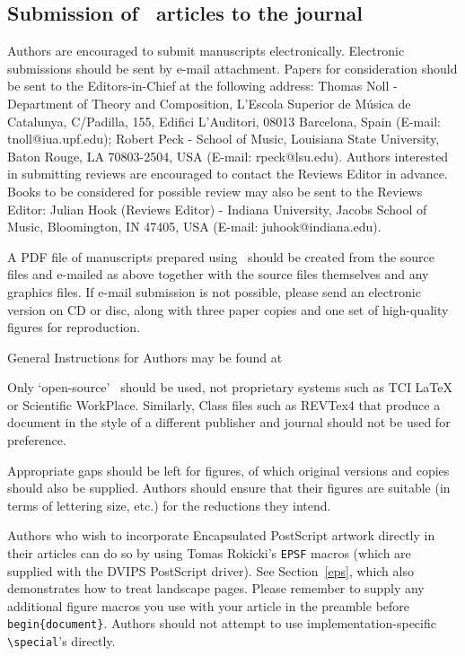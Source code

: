 \documentclass[]{tMAM2e}
\begin{document}
\subsection{Submission of \LaTeXe\ articles to the journal}

Authors are encouraged to submit manuscripts electronically. Electronic submissions should be sent by e-mail attachment. Papers for consideration should be sent to the Editors-in-Chief at the following address: Thomas Noll - Department of Theory and Composition, L'Escola Superior de M\'{u}sica de Catalunya, C/Padilla, 155, Edifici L'Auditori, 08013 Barcelona, Spain (E-mail: tnoll@iua.upf.edu); Robert Peck - School of Music, Louisiana State University, Baton Rouge, LA 70803-2504, USA (E-mail: rpeck@lsu.edu). Authors interested in submitting reviews are encouraged to contact the Reviews Editor in advance. Books to be considered for possible review may also be sent to the Reviews Editor: Julian Hook (Reviews Editor) - Indiana University, Jacobs School of Music, Bloomington, IN 47405, USA (E-mail: juhook@indiana.edu).

A PDF file of manuscripts prepared using \LaTeXe\ should be created from the source files and e-mailed as above together with the source files themselves and any graphics files. If e-mail submission is not possible, please send an electronic version on CD or disc, along with three paper copies and one set of high-quality figures for reproduction.

General Instructions for Authors may be found at

\centerline{}

Only `open-source' \LaTeXe\ should be used, not proprietary systems such as TCI LaTeX or Scientific WorkPlace. Similarly, Class files such as REVTex4 that produce a document in the style of a different publisher and journal should not be used for preference.

Appropriate gaps should be left for figures, of which original versions and copies should also be supplied.
Authors should ensure that their figures are suitable (in terms of lettering size, etc.) for the reductions they
intend.

Authors who wish to incorporate Encapsulated PostScript artwork directly in their articles can do so by using
Tomas Rokicki's {\tt EPSF} macros (which are supplied with the DVIPS PostScript driver). See Section~\ref{eps},
which also demonstrates how to treat landscape pages. Please remember to supply any additional figure macros you
use with your article in the preamble before \verb"begin{document}". Authors should not attempt to use
implementation-specific \verb"\special"'s directly.
\end{document}
